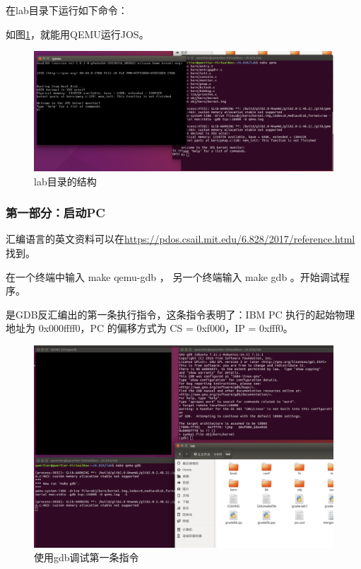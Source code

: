 \begin{ExerciseList}
在lab目录下运行如下命令：


如图\ref{fig:lab1:make_qemu}，就能用QEMU运行JOS。

\begin{figure}[H]
  \centering
  \includegraphics[width=6in]{figures/lab1/make_qemu.png}
  \caption{lab目录的结构}\label{fig:lab1:make_qemu}
\end{figure}

\subsubsection{第一部分：启动PC}


汇编语言的英文资料可以在\url{https://pdos.csail.mit.edu/6.828/2017/reference.html}找到。


在一个终端中输入 make qemu-gdb ， 另一个终端输入 make gdb 。开始调试程序。


是GDB反汇编出的第一条执行指令，这条指令表明了：IBM PC 执行的起始物理地址为 0x000ffff0，PC 的偏移方式为 CS = 0xf000，IP = 0xfff0。

\begin{figure}[H]
  \centering
  \includegraphics[width=6in]{figures/lab1/gdb.png}
  \caption{使用gdb调试第一条指令}\label{fig:lab1:gdb}
\end{figure}


\end{ExerciseList}
